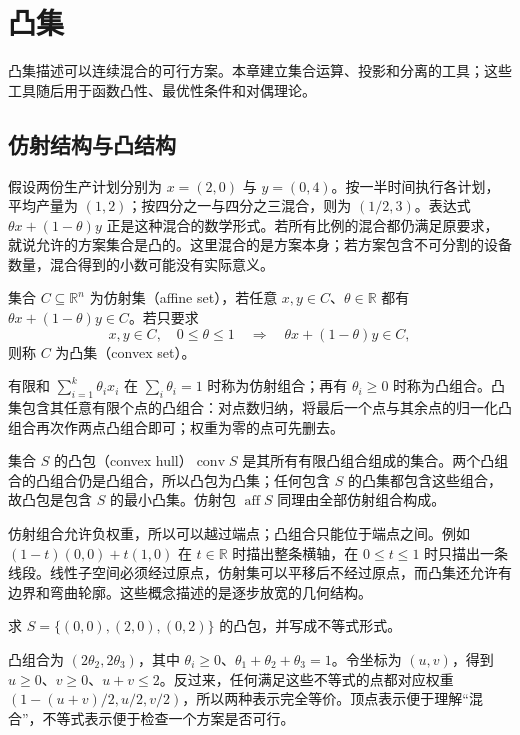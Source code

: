\setcounter{chapter}{1} %
\chapter{凸集}
\label{ch:co-sets}

凸集描述可以连续混合的可行方案。本章建立集合运算、投影和分离的工具；这些工具随后用于函数凸性、最优性条件和对偶理论。

\section{仿射结构与凸结构}

假设两份生产计划分别为 $x=(2,0)$ 与 $y=(0,4)$。按一半时间执行各计划，平均产量为 $(1,2)$；按四分之一与四分之三混合，则为 $(1/2,3)$。表达式 $\theta x+(1-\theta)y$ 正是这种混合的数学形式。若所有比例的混合都仍满足原要求，就说允许的方案集合是凸的。这里混合的是方案本身；若方案包含不可分割的设备数量，混合得到的小数可能没有实际意义。

\begin{definition}
集合 $C\subseteq\mathbb R^n$ 为仿射集（affine set），若任意 $x,y\in C$、$\theta\in\mathbb R$ 都有 $\theta x+(1-\theta)y\in C$。若只要求
\begin{equation}
 x,y\in C,\quad0\leq\theta\leq1
 \quad\Longrightarrow\quad\theta x+(1-\theta)y\in C,
 \label{eq:co-convex-set}
\end{equation}
则称 $C$ 为凸集（convex set）。
\end{definition}

有限和 $\sum_{i=1}^k\theta_i x_i$ 在 $\sum_i\theta_i=1$ 时称为仿射组合；再有 $\theta_i\geq0$ 时称为凸组合。凸集包含其任意有限个点的凸组合：对点数归纳，将最后一个点与其余点的归一化凸组合再次作两点凸组合即可；权重为零的点可先删去。

集合 $S$ 的凸包（convex hull）$\operatorname{conv}S$ 是其所有有限凸组合组成的集合。两个凸组合的凸组合仍是凸组合，所以凸包为凸集；任何包含 $S$ 的凸集都包含这些组合，故凸包是包含 $S$ 的最小凸集。仿射包 $\operatorname{aff}S$ 同理由全部仿射组合构成。

仿射组合允许负权重，所以可以越过端点；凸组合只能位于端点之间。例如 $(1-t)(0,0)+t(1,0)$ 在 $t\in\mathbb R$ 时描出整条横轴，在 $0\leq t\leq1$ 时只描出一条线段。线性子空间必须经过原点，仿射集可以平移后不经过原点，而凸集还允许有边界和弯曲轮廓。这些概念描述的是逐步放宽的几何结构。

\begin{example}[从三个点得到一个三角形]
求 $S=\{(0,0),(2,0),(0,2)\}$ 的凸包，并写成不等式形式。
\end{example}
\begin{solve}
凸组合为 $(2\theta_2,2\theta_3)$，其中 $\theta_i\geq0$、$\theta_1+\theta_2+\theta_3=1$。令坐标为 $(u,v)$，得到 $u\geq0$、$v\geq0$、$u+v\leq2$。反过来，任何满足这些不等式的点都对应权重 $(1-(u+v)/2,u/2,v/2)$，所以两种表示完全等价。顶点表示便于理解“混合”，不等式表示便于检查一个方案是否可行。
\end{solve}

